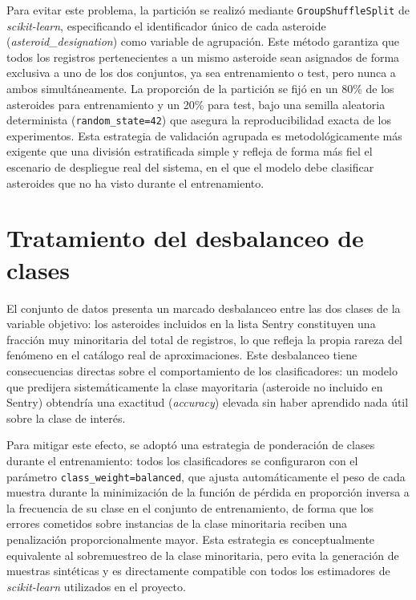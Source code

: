 \documentclass[12pt]{report} %
\begin{document}
Para evitar este problema, la partición se realizó mediante \texttt{GroupShuffleSplit} de \textit{scikit-learn}, especificando el identificador único de cada asteroide (\textit{asteroid\_designation}) como variable de agrupación. Este método garantiza que todos los registros pertenecientes a un mismo asteroide sean asignados de forma exclusiva a uno de los dos conjuntos, ya sea entrenamiento o test, pero nunca a ambos simultáneamente. La proporción de la partición se fijó en un 80\% de los asteroides para entrenamiento y un 20\% para test, bajo una semilla aleatoria determinista (\texttt{random\_state=42}) que asegura la reproducibilidad exacta de los experimentos. Esta estrategia de validación agrupada es metodológicamente más exigente que una división estratificada simple y refleja de forma más fiel el escenario de despliegue real del sistema, en el que el modelo debe clasificar asteroides que no ha visto durante el entrenamiento.
 
\section{Tratamiento del desbalanceo de clases}
 
El conjunto de datos presenta un marcado desbalanceo entre las dos clases de la variable objetivo: los asteroides incluidos en la lista Sentry constituyen una fracción muy minoritaria del total de registros, lo que refleja la propia rareza del fenómeno en el catálogo real de aproximaciones. Este desbalanceo tiene consecuencias directas sobre el comportamiento de los clasificadores: un modelo que predijera sistemáticamente la clase mayoritaria (asteroide no incluido en Sentry) obtendría una exactitud (\textit{accuracy}) elevada sin haber aprendido nada útil sobre la clase de interés.
 
Para mitigar este efecto, se adoptó una estrategia de ponderación de clases durante el entrenamiento: todos los clasificadores se configuraron con el parámetro \texttt{class\_weight=balanced}, que ajusta automáticamente el peso de cada muestra durante la minimización de la función de pérdida en proporción inversa a la frecuencia de su clase en el conjunto de entrenamiento, de forma que los errores cometidos sobre instancias de la clase minoritaria reciben una penalización proporcionalmente mayor. Esta estrategia es conceptualmente equivalente al sobremuestreo de la clase minoritaria, pero evita la generación de muestras sintéticas y es directamente compatible con todos los estimadores de \textit{scikit-learn} utilizados en el proyecto.
 
\end{document}
